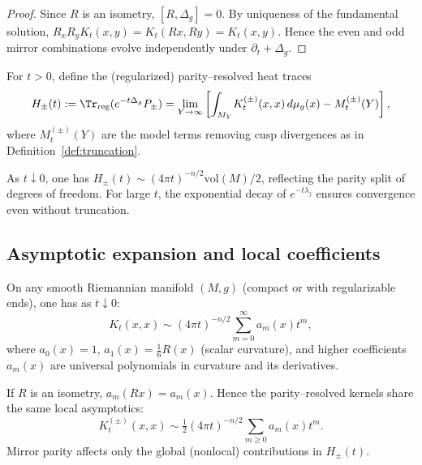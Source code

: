 \begin{proof}
Since $R$ is an isometry, $[R,\Delta_g]=0$.  
By uniqueness of the fundamental solution, $R_x R_y K_t(x,y)=K_t(Rx,Ry)=K_t(x,y)$.  
Hence the even and odd mirror combinations evolve independently under $\partial_t+\Delta_g$. %
\end{proof}

\begin{definition}
\label{def:heat-traces}
For $t>0$, define the (regularized) parity–resolved heat traces
\[
H_\pm(t):=\Tr_{\mathrm{reg}}(e^{-t\Delta_g}P_\pm)
=\lim_{Y\to\infty}\left[\int_{M_Y}\!K_t^{(\pm)}(x,x)\,d\mu_g(x)-M_t^{(\pm)}(Y)\right],
\]
where $M_t^{(\pm)}(Y)$ are the model terms removing cusp divergences as in Definition~\ref{def:truncation}. %
\end{definition}

\begin{remark}
\label{rem:heat-norm}
As $t\downarrow0$, one has $H_\pm(t)\sim (4\pi t)^{-n/2}\mathrm{vol}(M)/2$, reflecting the parity split of degrees of freedom.  
For large $t$, the exponential decay of $e^{-t\lambda_j}$ ensures convergence even without truncation. %
\end{remark}

\subsection{Asymptotic expansion and local coefficients}
\label{subsec:ch6-part2-asymptotic} \relax

\begin{theorem}
\label{thm:heat-asymptotic}
On any smooth Riemannian manifold $(M,g)$ (compact or with regularizable ends), one has as $t\downarrow0$:
\[
K_t(x,x)\sim (4\pi t)^{-n/2}\sum_{m=0}^\infty a_m(x)t^m,
\]
where $a_0(x)=1$, $a_1(x)=\tfrac{1}{6}R(x)$ (scalar curvature), and higher coefficients $a_m(x)$ are universal polynomials in curvature and its derivatives. %
\end{theorem}

\begin{remark}
\label{rem:coeff-invariance}
If $R$ is an isometry, $a_m(Rx)=a_m(x)$. Hence the parity–resolved kernels share the same local asymptotics:
\[
K_t^{(\pm)}(x,x)\sim \tfrac{1}{2}(4\pi t)^{-n/2}\sum_{m\ge0}a_m(x)t^m.
\]
Mirror parity affects only the global (nonlocal) contributions in $H_\pm(t)$. %
\end{remark}

